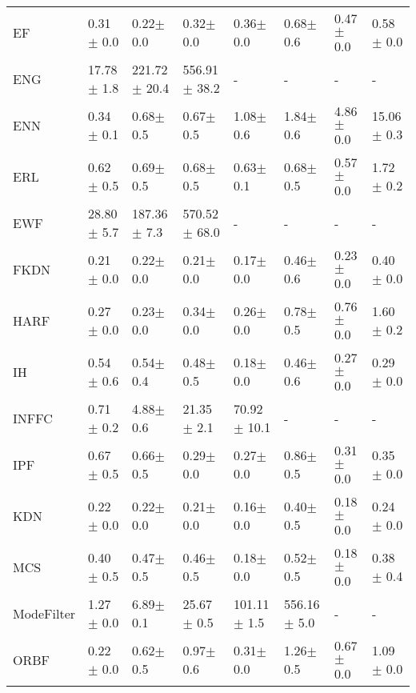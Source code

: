 \begin{tabular}{llllllll}
EF               &   0.31$\pm$ 0.0 &     0.22$\pm$ 0.0 &     0.32$\pm$ 0.0 &    0.36$\pm$ 0.0 &     0.68$\pm$ 0.6 &   0.47$\pm$ 0.0 &    0.58$\pm$ 0.0 \\
ENG              &  17.78$\pm$ 1.8 &  221.72$\pm$ 20.4 &  556.91$\pm$ 38.2 &                - &                 - &               - &                - \\
ENN              &   0.34$\pm$ 0.1 &     0.68$\pm$ 0.5 &     0.67$\pm$ 0.5 &    1.08$\pm$ 0.6 &     1.84$\pm$ 0.6 &   4.86$\pm$ 0.0 &   15.06$\pm$ 0.3 \\
ERL              &   0.62$\pm$ 0.5 &     0.69$\pm$ 0.5 &     0.68$\pm$ 0.5 &    0.63$\pm$ 0.1 &     0.68$\pm$ 0.5 &   0.57$\pm$ 0.0 &    1.72$\pm$ 0.2 \\
EWF              &  28.80$\pm$ 5.7 &   187.36$\pm$ 7.3 &  570.52$\pm$ 68.0 &                - &                 - &               - &                - \\
FKDN             &   0.21$\pm$ 0.0 &     0.22$\pm$ 0.0 &     0.21$\pm$ 0.0 &    0.17$\pm$ 0.0 &     0.46$\pm$ 0.6 &   0.23$\pm$ 0.0 &    0.40$\pm$ 0.0 \\
HARF             &   0.27$\pm$ 0.0 &     0.23$\pm$ 0.0 &     0.34$\pm$ 0.0 &    0.26$\pm$ 0.0 &     0.78$\pm$ 0.5 &   0.76$\pm$ 0.0 &    1.60$\pm$ 0.2 \\
IH               &   0.54$\pm$ 0.6 &     0.54$\pm$ 0.4 &     0.48$\pm$ 0.5 &    0.18$\pm$ 0.0 &     0.46$\pm$ 0.6 &   0.27$\pm$ 0.0 &    0.29$\pm$ 0.0 \\
INFFC            &   0.71$\pm$ 0.2 &     4.88$\pm$ 0.6 &    21.35$\pm$ 2.1 &  70.92$\pm$ 10.1 &                 - &               - &                - \\
IPF              &   0.67$\pm$ 0.5 &     0.66$\pm$ 0.5 &     0.29$\pm$ 0.0 &    0.27$\pm$ 0.0 &     0.86$\pm$ 0.5 &   0.31$\pm$ 0.0 &    0.35$\pm$ 0.0 \\
KDN              &   0.22$\pm$ 0.0 &     0.22$\pm$ 0.0 &     0.21$\pm$ 0.0 &    0.16$\pm$ 0.0 &     0.40$\pm$ 0.5 &   0.18$\pm$ 0.0 &    0.24$\pm$ 0.0 \\
MCS              &   0.40$\pm$ 0.5 &     0.47$\pm$ 0.5 &     0.46$\pm$ 0.5 &    0.18$\pm$ 0.0 &     0.52$\pm$ 0.5 &   0.18$\pm$ 0.0 &    0.38$\pm$ 0.4 \\
ModeFilter       &   1.27$\pm$ 0.0 &     6.89$\pm$ 0.1 &    25.67$\pm$ 0.5 &  101.11$\pm$ 1.5 &   556.16$\pm$ 5.0 &               - &                - \\
ORBF             &   0.22$\pm$ 0.0 &     0.62$\pm$ 0.5 &     0.97$\pm$ 0.6 &    0.31$\pm$ 0.0 &     1.26$\pm$ 0.5 &   0.67$\pm$ 0.0 &    1.09$\pm$ 0.0 \\

\end{tabular}
